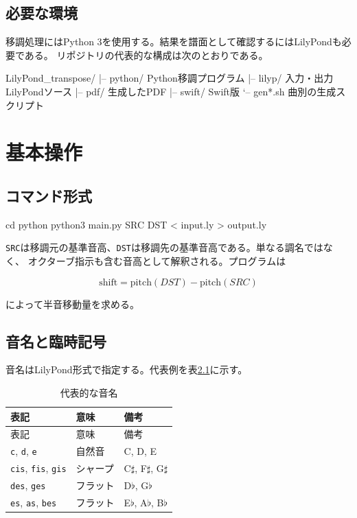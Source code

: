 \documentclass[uplatex,a4paper,11pt]{jsbook}
\begin{document}
\section{必要な環境}

移調処理にはPython 3を使用する。結果を譜面として確認するにはLilyPondも必要である。
リポジトリの代表的な構成は次のとおりである。

\begin{command}
LilyPond_transpose/
|-- python/       Python移調プログラム
|-- lilyp/        入力・出力LilyPondソース
|-- pdf/          生成したPDF
|-- swift/        Swift版
`-- gen*.sh       曲別の生成スクリプト
\end{command}

\chapter{基本操作}

\section{コマンド形式}

\begin{command}
cd python
python3 main.py SRC DST < input.ly > output.ly
\end{command}

\texttt{SRC}は移調元の基準音高、\texttt{DST}は移調先の基準音高である。単なる調名ではなく、
オクターブ指示も含む音高として解釈される。プログラムは

\begin{equation}
  \mathrm{shift}=\mathrm{pitch}(DST)-\mathrm{pitch}(SRC)
\end{equation}

によって半音移動量を求める。

\section{音名と臨時記号}

音名はLilyPond形式で指定する。代表例を表\ref{tab:pitch-name}に示す。

\begin{longtable}{@{}lll@{}}
\caption{代表的な音名}\label{tab:pitch-name}\\
\toprule
表記 & 意味 & 備考\\
\midrule
\endfirsthead
\toprule
表記 & 意味 & 備考\\
\midrule
\endhead
\texttt{c}, \texttt{d}, \texttt{e} & 自然音 & C, D, E\\
\texttt{cis}, \texttt{fis}, \texttt{gis} & シャープ & C\(\sharp\), F\(\sharp\), G\(\sharp\)\\
\texttt{des}, \texttt{ges} & フラット & D\(\flat\), G\(\flat\)\\
\texttt{es}, \texttt{as}, \texttt{bes} & フラット & E\(\flat\), A\(\flat\), B\(\flat\)\\
\bottomrule
\end{longtable}
\end{document}
